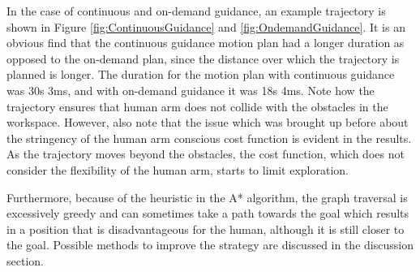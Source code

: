 In the case of continuous and on-demand guidance, an example trajectory is shown in Figure \ref{fig:ContinuousGuidance} and \ref{fig:OndemandGuidance}. 
It is an obvious find that the continuous guidance motion plan had a longer duration as opposed to the on-demand plan, since the distance over which the trajectory is planned is longer. 
The duration for the motion plan with continuous guidance was 30s 3ms, and with on-demand guidance it was 18s 4ms. 
Note how the trajectory ensures that human arm does not collide with the obstacles in the workspace. 
However, also note that the issue which was brought up before about the stringency of the human arm conscious cost function is evident in the results. 
As the trajectory moves beyond the obstacles, the cost function, which does not consider the flexibility of the human arm, starts to limit exploration. 

Furthermore, because of the heuristic in the A* algorithm, the graph traversal is excessively greedy and can sometimes take a path towards the goal which results in a position that is disadvantageous for the human, although it is still closer to the goal. 
Possible methods to improve the strategy are discussed in the discussion section.  
